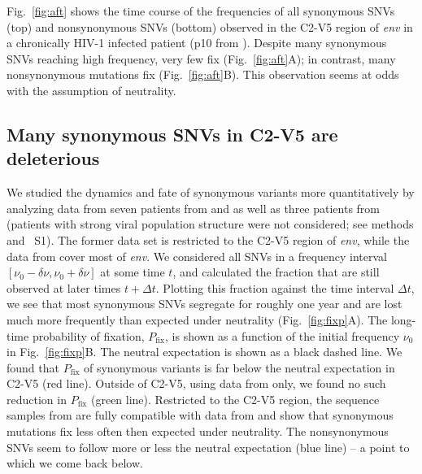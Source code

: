 \documentclass[11pt]{article}
\newcommand{\pfix}{P_{\mathrm{fix}}}
\newcommand{\FIG}[1]{Fig.~\ref{fig:#1}}
\newcommand{\env}{\textit{env}}
\newcommand{\shankaregion}{C2-V5}
\newcommand{\PCApat}{1}
\begin{document}
\FIG{aft} shows the time course of the frequencies of all synonymous
SNVs (top) and nonsynonymous SNVs (bottom) observed in the
\shankaregion{} region of \env{} in a chronically HIV-1 infected patient (p10 from
\citet{shankarappa_consistent_1999}). Despite many synonymous SNVs
reaching high frequency, very few fix (Fig.~\ref{fig:aft}A); in
contrast, many nonsynonymous mutations fix
(Fig.~\ref{fig:aft}B). This observation seems at odds with
the assumption of neutrality.

\subsection*{Many synonymous SNVs in \shankaregion{} are deleterious}
We studied the dynamics and fate of synonymous variants more quantitatively by
analyzing data from seven patients from \citet{shankarappa_consistent_1999} and
\citet{liu_selection_2006} as well as three patients from
\citet{bunnik_autologous_2008} (patients with strong viral population structure
were not considered; see methods and \figurename~S\PCApat). The
former data set is restricted to the \shankaregion{} region of \env, while the
data from \citet{bunnik_autologous_2008} cover most of \env.  We considered all
SNVs in a frequency interval $[\nu_0-\delta\nu, \nu_0+\delta\nu]$ at some time
$t$, and calculated the fraction that are still observed at later times $t+\Delta
t$. Plotting this fraction against the time interval $\Delta t$, we see that
most synonymous SNVs segregate for roughly one year and are lost much more
frequently than expected under neutrality (Fig.~\ref{fig:fixp}A). The long-time
probability of fixation, $\pfix$, is shown as a function of the initial
frequency $\nu_0$ in Fig.~\ref{fig:fixp}B. The neutral expectation is
shown as a black dashed line. We found that $\pfix$ of synonymous
variants is far below the neutral expectation in \shankaregion{} (red line).
Outside of \shankaregion, using data from \citet{bunnik_autologous_2008} only,
we found no such reduction in $\pfix$ (green line). Restricted to the
\shankaregion{} region, the sequence samples from \citet{bunnik_autologous_2008}
are fully compatible with data from \citet{shankarappa_consistent_1999}
and show that synonymous mutations fix less often then expected under neutrality. The
nonsynonymous SNVs seem to follow more or less the neutral expectation (blue
line) -- a point to which we come back below.
\end{document}
